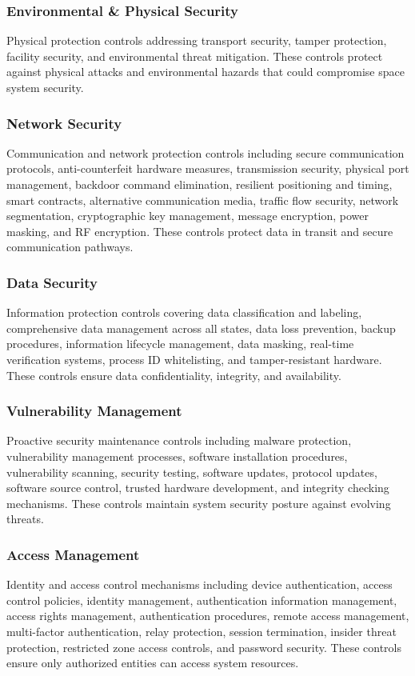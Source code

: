 \documentclass[binding=0.6cm]{sapthesis}
\begin{document}
\subsubsection{Environmental \& Physical Security}
Physical protection controls addressing transport security, tamper protection, facility security, and environmental threat mitigation. These controls protect against physical attacks and environmental hazards that could compromise space system security.

\subsubsection{Network Security}
Communication and network protection controls including secure communication protocols, anti-counterfeit hardware measures, transmission security, physical port management, backdoor command elimination, resilient positioning and timing, smart contracts, alternative communication media, traffic flow security, network segmentation, cryptographic key management, message encryption, power masking, and RF encryption. These controls protect data in transit and secure communication pathways.

\subsubsection{Data Security}
Information protection controls covering data classification and labeling, comprehensive data management across all states, data loss prevention, backup procedures, information lifecycle management, data masking, real-time verification systems, process ID whitelisting, and tamper-resistant hardware. These controls ensure data confidentiality, integrity, and availability.

\subsubsection{Vulnerability Management}
Proactive security maintenance controls including malware protection, vulnerability management processes, software installation procedures, vulnerability scanning, security testing, software updates, protocol updates, software source control, trusted hardware development, and integrity checking mechanisms. These controls maintain system security posture against evolving threats.

\subsubsection{Access Management}
Identity and access control mechanisms including device authentication, access control policies, identity management, authentication information management, access rights management, authentication procedures, remote access management, multi-factor authentication, relay protection, session termination, insider threat protection, restricted zone access controls, and password security. These controls ensure only authorized entities can access system resources.
\end{document}
